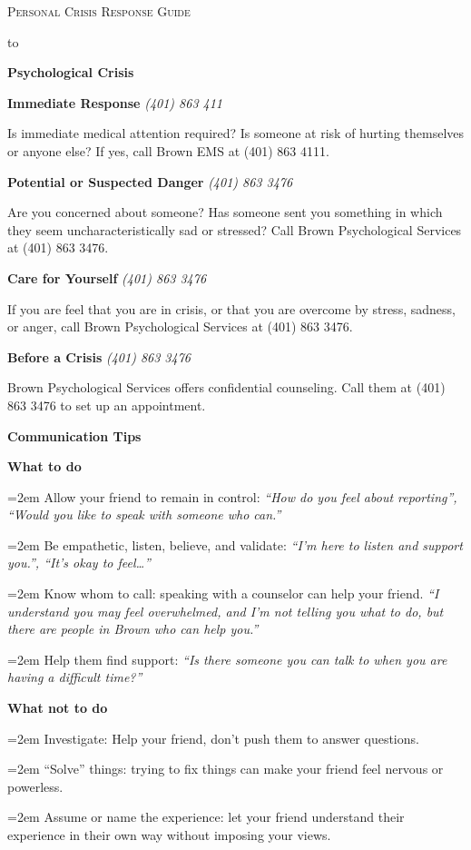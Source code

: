 \documentclass[letterpaper,10pt]{report}
\def\headline#1{\hbox to \hsize{\hrulefill\quad\lower.3em\hbox{#1}\quad\hrulefill}}
\newcommand{\tosay}[1]{\textit{#1}}
\newcommand{\situation}[4]{

\parbox{\columnwidth}{
\textbf{#1} \hspace{\fill} \textit{#2} 


#3 \ifthenelse{\isempty{#4}}{}{\\ \tosay{#4}}
\vspace{6pt}}}
\newcommand{\tip}[1]{

\hangindent=2em\hangafter=1 
#1}
\newcommand{\type}[1]{\parbox{\columnwidth}{\large\textbf{#1}}}
\begin{document}
\setlength{\columnsep}{0.5in}

\begin{center}
\textsc{\huge\centering Personal Crisis Response Guide}  
\end{center}

\headline{\textit{how to support a friend}}

\vfill

\begin{multicols}{2}
\begin{spacing}{1.15}
\type{Psychological Crisis}

\situation{Immediate Response}{(401) 863 411}{Is immediate medical attention required? Is someone at risk of hurting themselves or anyone else? If yes, call Brown EMS at (401) 863 4111.}{}

\situation{Potential or Suspected Danger}{(401) 863 3476} {Are you concerned about someone? Has someone sent you something in which they seem uncharacteristically sad or stressed? Call Brown Psychological Services at (401) 863 3476.}{}

\situation{Care for Yourself}{(401) 863 3476} { If you are feel that you are in crisis, or that you are overcome by stress, sadness, or anger, call Brown Psychological Services at (401) 863 3476.}{}

\situation{Before a Crisis}{(401) 863 3476} {Brown Psychological Services offers confidential counseling. Call them at (401) 863 3476 to set up an appointment.}{}

\type{Communication Tips}

\situation {What to do} {} {
  \tip{Allow your friend to remain in control: \tosay{``How do you feel about reporting'', ``Would you like to speak with someone who can.''}}
  \tip{Be empathetic, listen, believe, and validate: \tosay{``I'm here to listen and support you.'', ``It's okay to feel\ldots''}}
  \tip{Know whom to call: speaking with a counselor can help your friend. \tosay{``I understand you may feel overwhelmed, and I'm not telling you what to do, but there are people in Brown who can help you.''}}
  \tip{Help them find support: \tosay{``Is there someone you can talk to when you are having a difficult time?''}}
}{}


\situation {What not to do}{}{
  \tip{Investigate: Help your friend, don't push them to answer questions.}
  \tip{``Solve'' things: trying to fix things can make your friend feel nervous or powerless.}
  \tip{Assume or name the experience: let your friend understand their experience in their own way without imposing your views.}
}{}


\end{spacing}
\end{multicols}
\end{document}
